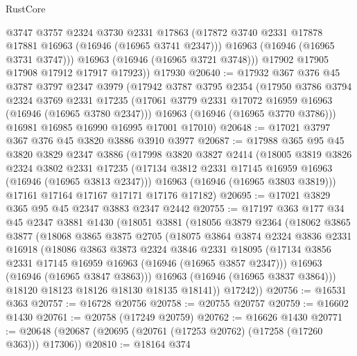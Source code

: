 \begin{lexlean}{RustCore}
\begin{coremodule}
            @3747
            @3757
            @2324
            @3730
            @2331
            @17863
            (@17872 @3740 @2331 @17878 @17881 @16963 (@16946 (@16965 @3741 @2347)))
            @16963
            (@16946 (@16965 @3731 @3747)))
          @16963
          (@16946 (@16965 @3721 @3748)))
        @17902
        @17905
        @17908
        @17912
        @17917
        @17923))
    @17930
@20640 := @17932
    @367
    @376
    @45
    @3787
    @3797
    @2347
    @3979
    (@17942
      @3787
      @3795
      @2354
      (@17950
        @3786
        @3794
        @2324
        @3769
        @2331
        @17235
        (@17061 @3779 @2331 @17072 @16959 @16963 (@16946 (@16965 @3780 @2347)))
        @16963
        (@16946 (@16965 @3770 @3786)))
      @16981
      @16985
      @16990
      @16995
      @17001
      @17010)
@20648 := @17021 @3797 @367 @376 @45 @3820 @3886 @3910 @3977
@20687 := @17988
    @365
    @95
    @45
    @3820
    @3829
    @2347
    @3886
    (@17998
      @3820
      @3827
      @2414
      (@18005
        @3819
        @3826
        @2324
        @3802
        @2331
        @17235
        (@17134 @3812 @2331 @17145 @16959 @16963 (@16946 (@16965 @3813 @2347)))
        @16963
        (@16946 (@16965 @3803 @3819)))
      @17161
      @17164
      @17167
      @17171
      @17176
      @17182)
@20695 := @17021 @3829 @365 @95 @45 @2347 @3883 @2347 @2442
@20755 := @17197
    @363
    @177
    @34
    @45
    @2347
    @3881
    @1430
    (@18051
      @3881
      (@18056
        @3879
        @2364
        (@18062
          @3865
          @3877
          (@18068
            @3865
            @3875
            @2705
            (@18075
              @3864
              @3874
              @2324
              @3836
              @2331
              @16918
              (@18086
                @3863
                @3873
                @2324
                @3846
                @2331
                @18095
                (@17134 @3856 @2331 @17145 @16959 @16963 (@16946 (@16965 @3857 @2347)))
                @16963
                (@16946 (@16965 @3847 @3863)))
              @16963
              (@16946 (@16965 @3837 @3864)))
            @18120
            @18123
            @18126
            @18130
            @18135
            @18141))
        @17242))
@20756 := @16531 @363
@20757 := @16728 @20756
@20758 := @20755 @20757
@20759 := @16602 @1430
@20761 := @20758 (@17249 @20759)
@20762 := @16626 @1430
@20771 := @20648 (@20687 (@20695 (@20761 (@17253 @20762) (@17258 (@17260 @363))) @17306))
@20810 := @18164
    @374

\end{coremodule}
\end{lexlean}
